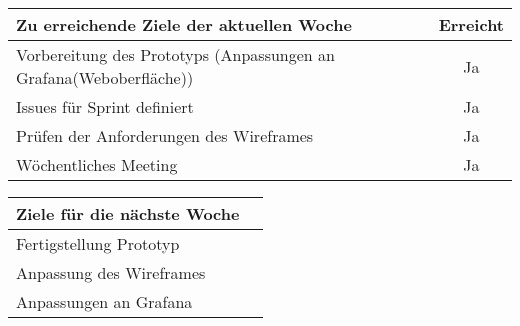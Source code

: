 \begin{tabularx}{\textwidth}{Xc}
    \arrayrulecolor{OliveGreen}
    \toprule
    {\bfseries Zu erreichende Ziele der aktuellen Woche} & {\bfseries Erreicht} \\
    \midrule[2pt]
    Vorbereitung des Prototyps (Anpassungen an Grafana(Weboberfläche)) &Ja   \\
    \rowcolor{OliveGreen!15}
    Issues für Sprint definiert                                        &Ja   \\
    \rowcolor{White}
    Prüfen der Anforderungen des Wireframes                            &Ja   \\
    \rowcolor{OliveGreen!15}
    Wöchentliches Meeting                                              &Ja   \\
   \bottomrule[2pt]
\end{tabularx}
%
\vspace{1cm}
%
\begin{tabularx}{\textwidth}{Xc}
    \arrayrulecolor{OliveGreen}
    \toprule
    {\bfseries Ziele für die nächste Woche}          &                      \\
    \midrule[2pt]
    Fertigstellung Prototyp                          &                      \\
    \rowcolor{OliveGreen!15}
    Anpassung des Wireframes                         &                      \\
    \rowcolor{White}
    Anpassungen an Grafana                           &                      \\
\end{tabularx}
